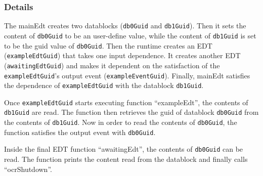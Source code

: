 \subsubsection{Details}

The mainEdt creates two datablocks ({\tt db0Guid} and {\tt db1Guid}).
Then it sets the content of {\tt db0Guid} to be an user-define value,
while the content of {\tt db1Guid} is set to be the guid value of {\tt db0Guid}.
Then the runtime creates an EDT ({\tt exampleEdtGuid}) that takes one input dependence.
It creates another EDT ({\tt awaitingEdtGuid}) and makes it dependent on the satisfaction of the {\tt exampleEdtGuid}'s output event ({\tt exampleEventGuid}).
Finally, mainEdt satisfies the dependence of {\tt exampleEdtGuid} with the datablock {\tt db1Guid}.

Once {\tt exampleEdtGuid} starts executing function ``exampleEdt'', the contents of {\tt db1Guid} are read.
The function then retrieves the guid of datablock {\tt db0Guid} from the contents of {\tt db1Guid}.
Now in order to read the contents of {\tt db0Guid}, the function satisfies the output event with {\tt db0Guid}.

Inside the final EDT function ``awaitingEdt'', the contents of {\tt db0Guid} can be read.
The function prints the content read from the datablock and finally calls ``ocrShutdown''.
